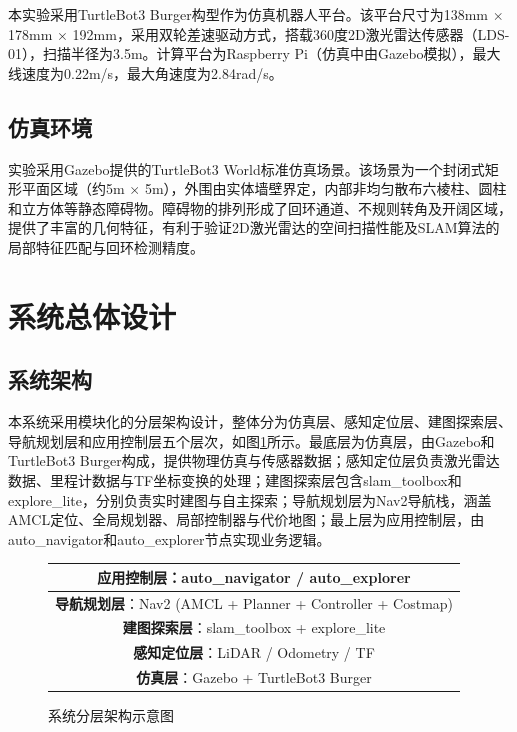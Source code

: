 \documentclass[a4paper,12pt]{article}
\begin{document}
本实验采用TurtleBot3 Burger构型作为仿真机器人平台。该平台尺寸为138mm $\times$ 178mm $\times$ 192mm，采用双轮差速驱动方式，搭载360度2D激光雷达传感器（LDS-01），扫描半径为3.5m。计算平台为Raspberry Pi（仿真中由Gazebo模拟），最大线速度为0.22m/s，最大角速度为2.84rad/s。

\subsection{仿真环境}

实验采用Gazebo提供的TurtleBot3 World标准仿真场景。该场景为一个封闭式矩形平面区域（约5m $\times$ 5m），外围由实体墙壁界定，内部非均匀散布六棱柱、圆柱和立方体等静态障碍物。障碍物的排列形成了回环通道、不规则转角及开阔区域，提供了丰富的几何特征，有利于验证2D激光雷达的空间扫描性能及SLAM算法的局部特征匹配与回环检测精度。

\section{系统总体设计}

\subsection{系统架构}

本系统采用模块化的分层架构设计，整体分为仿真层、感知定位层、建图探索层、导航规划层和应用控制层五个层次，如图\ref{fig:architecture}所示。最底层为仿真层，由Gazebo和TurtleBot3 Burger构成，提供物理仿真与传感器数据；感知定位层负责激光雷达数据、里程计数据与TF坐标变换的处理；建图探索层包含slam\_toolbox和explore\_lite，分别负责实时建图与自主探索；导航规划层为Nav2导航栈，涵盖AMCL定位、全局规划器、局部控制器与代价地图；最上层为应用控制层，由auto\_navigator和auto\_explorer节点实现业务逻辑。

\begin{figure}[H]
\centering
\begin{tabular}{|c|}
\hline
\textbf{应用控制层}：auto\_navigator / auto\_explorer \\
\hline
\textbf{导航规划层}：Nav2 (AMCL + Planner + Controller + Costmap) \\
\hline
\textbf{建图探索层}：slam\_toolbox + explore\_lite \\
\hline
\textbf{感知定位层}：LiDAR / Odometry / TF \\
\hline
\textbf{仿真层}：Gazebo + TurtleBot3 Burger \\
\hline
\end{tabular}
\caption{系统分层架构示意图}
\label{fig:architecture}
\end{figure}
\end{document}
